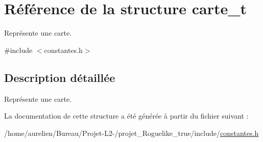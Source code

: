 \hypertarget{structcarte__t}{}\section{Référence de la structure carte\+\_\+t}
\label{structcarte__t}


Représente une carte.  




{\ttfamily \#include $<$constantes.\+h$>$}



\subsection{Description détaillée}
Représente une carte. 

La documentation de cette structure a été générée à partir du fichier suivant \+:\begin{DoxyCompactItemize}
\item 
/home/aurelien/\+Bureau/\+Projet-\/\+L2-\//projet\+\_\+\+Roguelike\+\_\+true/include/\hyperlink{constantes_8h}{constantes.\+h}\end{DoxyCompactItemize}
